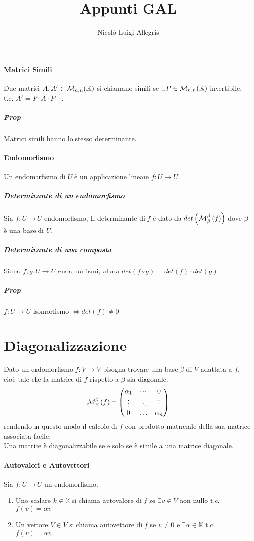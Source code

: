 \documentclass[a4paper,10pt]{article}
\title{Appunti GAL}
\author{Nicolò Luigi Allegris}
\date{}
\begin{document}
\maketitle

\paragraph{Matrici Simili} Due matrici $A, A' \in {\cal{M}}_{n,n}(\mathbb{K})$
si chiamano simili se $\exists P \in {\cal{M}}_{n.n}(\mathbb{K})$ invertibile,
t.c. $A' = P \cdot A \cdot P^{-1}$.
\subparagraph{Prop} Matrici simili hanno lo stesso determinante.

\paragraph{Endomorfismo} Un endomorfismo di $U$ è un applicazione lineare $f: U
\rightarrow U$.

\subparagraph{Determinante di un endomorfismo} Sia $f: U \rightarrow U$
endomorfismo, Il determinante di $f$ è dato da
$det\left({\cal{M}}_{\beta}^{\beta}\left(f\right)\right)$ dove $\beta$ è una
base di $U$.

\subparagraph{Determinante di una composta} Siano $f,g: U \rightarrow U$
endomorfismi, allora $det\left(f \circ g \right) = det\left(f \right) \cdot
det\left(g \right)$

\subparagraph{Prop} $f: U \rightarrow U$ isomorfismo $\Leftrightarrow
det\left(f\right) \neq 0$

\section{Diagonalizzazione}
Dato un endomorfismo $f: V \rightarrow V$ bisogna trovare una base $\beta$ di
$V$ adattata a $f$, cioè tale che la matrice di $f$ rispetto a $\beta$ sia
diagonale.
\[{\cal M}_\beta^\beta\left(f\right) =
\begin{pmatrix}
\alpha_1 & \cdots & 0 \\
\vdots & \ddots & \vdots \\
0 & \ldots & \alpha_n
\end{pmatrix}\]
rendendo in questo modo il calcolo di $f$ con prodotto matriciale della sua
matrice associata facile. \\
Una matrice è diagonalizzabile se e solo se è simile a una matrice diagonale.

\paragraph{Autovalori e Autovettori} Sia $f: U \rightarrow U$ un endomorfismo.
\begin{enumerate}
  \item Uno scalare $k \in \mathbb{K}$ si chiama autovalore di $f$ se
$\exists v \in V$ non nullo t.c. $f\left(v\right) = \alpha v$
  \item Un vettore $V \in V$ si chiama autovettore di $f$ se
$v \neq 0$ e $\exists \alpha \in \mathbb{K}$ t.c. $f\left(v\right) = \alpha v$
\end{enumerate}
\end{document}
